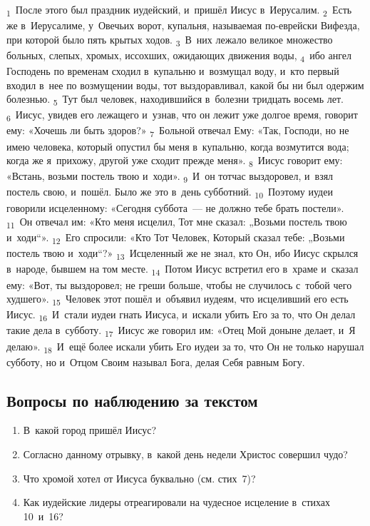 \documentclass[a4paper,12pt]{article}
\begin{document}
\textsubscript{1}~После этого был праздник иудейский, и~пришёл Иисус в~Иерусалим.
\textsubscript{2}~Есть же в~Иерусалиме, у~Овечьих ворот, купальня, называемая по-еврейски Вифезда, при которой было пять крытых ходов.
\textsubscript{3}~В~них лежало великое множество больных, слепых, хромых, иссохших, ожидающих движения воды,
\textsubscript{4}~ибо ангел Господень по временам сходил в~купальню и~возмущал воду, и~кто первый входил в~нее по возмущении воды, тот выздоравливал, какой бы ни был одержим болезнью.
\textsubscript{5}~Тут был человек, находившийся в~болезни тридцать восемь лет.
\textsubscript{6}~Иисус, увидев его лежащего и~узнав, что он лежит уже долгое время, говорит ему: «Хочешь ли быть здоров?»
\textsubscript{7}~Больной отвечал Ему: «Так, Господи, но не имею человека, который опустил бы меня в~купальню, когда возмутится вода; когда же я~прихожу, другой уже сходит прежде меня».
\textsubscript{8}~Иисус говорит ему: «Встань, возьми постель твою и~ходи».
\textsubscript{9}~И~он тотчас выздоровел, и~взял постель свою, и~пошёл. Было же это в~день субботний.
\textsubscript{10}~Поэтому иудеи говорили исцеленному: «Сегодня суббота~--- не должно тебе брать постели».
\textsubscript{11}~Он отвечал им: «Кто меня исцелил, Тот мне сказал: „Возьми постель твою и~ходи“».
\textsubscript{12}~Его спросили: «Кто Тот Человек, Который сказал тебе: „Возьми постель твою и~ходи“?»
\textsubscript{13}~Исцеленный же не знал, кто Он, ибо Иисус скрылся в~народе, бывшем на том месте.
\textsubscript{14}~Потом Иисус встретил его в~храме и~сказал ему: «Вот, ты выздоровел; не греши больше, чтобы не случилось с~тобой чего худшего».
\textsubscript{15}~Человек этот пошёл и~объявил иудеям, что исцеливший его есть Иисус.
\textsubscript{16}~И~стали иудеи гнать Иисуса, и~искали убить Его за то, что Он делал такие дела в~субботу.
\textsubscript{17}~Иисус же говорил им: «Отец Мой доныне делает, и~Я делаю».
\textsubscript{18}~И~ещё более искали убить Его иудеи за то, что Он не только нарушал субботу, но и~Отцом Своим называл Бога, делая Себя равным Богу. 

\subsection*{Вопросы по наблюдению за текстом}
\begin{enumerate}
    \item В~какой город пришёл Иисус? 
    
    \myline
    
    \item Согласно данному отрывку, в~какой день недели Христос совершил чудо? 
    
    \myline
    \item Что хромой хотел от Иисуса буквально (см. стих~7)? 
    
    \myline
    
    \myline
    \item Как иудейские лидеры отреагировали на чудесное исцеление в~стихах 10~и~16? 
    
    \myline
    
    \myline
\end{enumerate}
\end{document}

